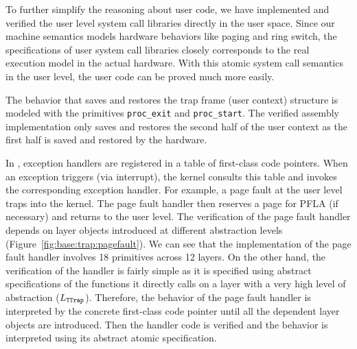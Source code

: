 To further simplify the reasoning about user code, we have implemented and
verified the user level system call libraries directly in the user space.
Since our machine semantics models hardware behaviors
like paging and ring switch, the specifications of user system call
libraries closely corresponds to the real execution model in the actual
hardware. With this atomic system call semantics in the user level,
the user code can be proved much more easily.

The behavior that saves and restores the trap frame (user context)
structure is modeled with the primitives \verb"proc_exit" and
\verb"proc_start".  The verified assembly implementation only saves
and restores the second half of the user context as the first half is
saved and restored by the hardware.  

In \mCTOSbase{}, exception handlers are registered in a table of first-class code pointers.
When an exception triggers (via interrupt), the kernel consults this table
and invokes the corresponding exception handler.
For example, a page fault at the user level traps into the kernel.
The page fault handler then reserves a page for PFLA (if necessary)
and returns to the user level.
The verification of the page fault handler depends on layer objects introduced
at different abstraction levels (\cf Figure~\ref{fig:base:trap:pagefault}).
We can see that the
implementation of the page fault handler involves 18 primitives across
12 layers.  On the other hand, the verification of the handler is
fairly simple as it is specified using abstract specifications of the
functions it directly calls on a layer with a very high level of
abstraction ($L_{\texttt{TTrap}}$).
Therefore, the behavior of the page fault handler is interpreted by
the concrete first-class code pointer until all the dependent layer
objects are introduced.  Then the handler code is verified and
the behavior is interpreted using its abstract atomic specification.





